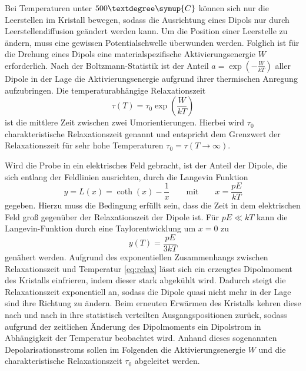 Bei Temperaturen unter $500°\symup{C}$ können sich nur die Leerstellen im Kristall bewegen, sodass die Ausrichtung eines Dipols nur durch Leerstellendiffusion geändert werden kann.
Um die Position einer Leerstelle zu ändern, muss eine gewissen Potentialschwelle überwunden werden.
Folglich ist für die Drehung eines Dipols eine materialspezifische Aktivierungsenergie $W$ erforderlich.
Nach der Boltzmann-Statistik ist der Anteil ${a=\exp(-\frac{W}{kT})}$ aller Dipole in der Lage die Aktivierungsenergie aufgrund ihrer thermischen Anregung aufzubringen.
Die temperaturabhängige Relaxationszeit
\begin{equation}\label{eq:relax}
  \tau(T)=\tau_0\exp\left( \frac{W}{kT}\right )
\end{equation}
ist die mittlere Zeit zwischen zwei Umorientierungen.
Hierbei wird $\tau_0$ charakteristische Relaxationszeit genannt und entspricht dem Grenzwert der Relaxationszeit für sehr hohe Temperaturen $\tau_0 = \tau(T\rightarrow \infty)$.

Wird die Probe in ein elektrisches Feld gebracht, ist der Anteil der Dipole, die sich entlang der Feldlinien ausrichten, durch die Langevin Funktion
\begin{equation}\label{eq:Langevin}
    y = L(x) = \coth(x)-\frac{1}{x} \qquad \text{mit} \qquad x=\frac{pE}{kT}
\end{equation}
gegeben.
Hierzu muss die Bedingung erfüllt sein, dass die Zeit in dem elektrischen Feld groß gegenüber der Relaxationszeit der Dipole ist.
Für $pE \ll kT$ kann die Langevin-Funktion durch eine Taylorentwicklung um $x=0$ zu 
\begin{equation}\label{eq:Langevin2}
    y(T)=\frac{pE}{3kT}
\end{equation}
genähert werden.
Aufgrund des exponentiellen Zusammenhangs zwischen Relaxationszeit und Temperatur \eqref{eq:relax} lässt sich ein erzeugtes Dipolmoment des Kristalls einfrieren, indem dieser stark abgekühlt wird.
Dadurch steigt die Relaxationszeit exponentiell an, sodass die Dipole quasi nicht mehr in der Lage sind ihre Richtung zu ändern.
Beim erneuten Erwärmen des Kristalls kehren diese nach und nach in ihre statistisch verteilten Ausgangspositionen zurück, sodass aufgrund der zeitlichen Änderung des Dipolmoments ein Dipolstrom in Abhängigkeit der Temperatur beobachtet wird.
Anhand dieses sogenannten Depolarisationsstroms sollen im Folgenden die Aktivierungsenergie $W$ und die charakteristische Relaxationszeit $\tau_0$ abgeleitet werden.

